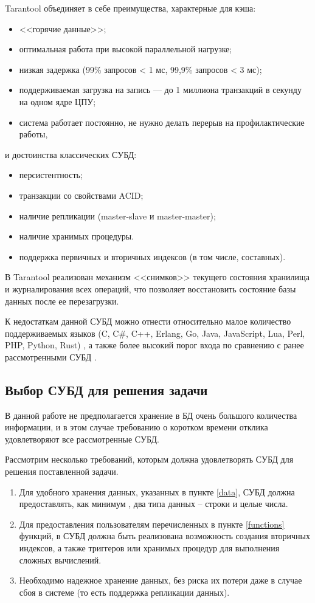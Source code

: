 Tarantool объединяет в себе преимущества, характерные для кэша:
\begin{itemize}
	\item <<горячие данные>>;
	\item оптимальная работа при высокой параллельной нагрузке;
	\item низкая задержка (99\% запросов < 1 мс, 99,9\% запросов < 3 мс);
	\item поддерживаемая загрузка на запись — до 1 миллиона транзакций в секунду на одном ядре ЦПУ;
	\item система работает постоянно, не нужно делать перерыв на профилактические работы,
\end{itemize}
и достоинства классических СУБД:
\begin{itemize}
	\item персистентность;
	\item транзакции со свойствами ACID;
	\item наличие репликации (master-slave и master-master);
	\item наличие хранимых процедуры.
	\item поддержка первичных и вторичных индексов (в том числе, составных).
\end{itemize}


В Tarantool реализован механизм <<снимков>> текущего состояния хранилища и журналирования всех операций, что позволяет восстановить состояние базы данных после ее перезагрузки.

К недостаткам данной СУБД можно отнести относительно малое количество поддерживаемых языков (C, C\#, C++, Erlang, Go, Java, JavaScript, Lua, Perl, PHP, Python, Rust) \cite{tarantool}, а также более высокий порог входа по сравнению с ранее рассмотренными СУБД \cite{redis2}.


\subsection{Выбор СУБД для решения задачи}

В данной работе не предполагается хранение в БД очень большого количества информации, и в этом случае требованию о коротком времени отклика удовлетворяют все рассмотренные СУБД.

Рассмотрим несколько требований, которым должна удовлетворять СУБД для решения поставленной задачи.

\begin{enumerate}
	\item Для удобного хранения данных, указанных в пункте \ref{data}, СУБД должна предоставлять, как минимум , два типа данных -- строки и целые числа. 
	\item Для предоставления пользователям перечисленных в пункте \ref{functions} функций, в СУБД должна быть реализована возможность создания вторичных индексов, а также триггеров или хранимых процедур для выполнения сложных вычислений. 
	\item Необходимо надежное хранение данных, без риска их потери даже в случае сбоя в системе (то есть поддержка репликации данных).
\end{enumerate} 


